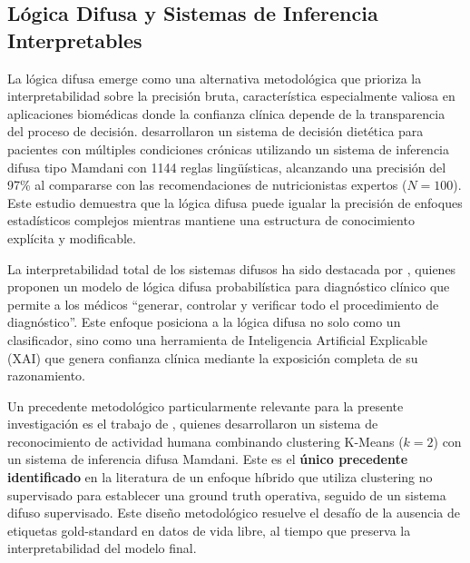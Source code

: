 
\subsection{Lógica Difusa y Sistemas de Inferencia Interpretables}
\label{subsec:fuzzy_logic}

La lógica difusa emerge como una alternativa metodológica que prioriza la interpretabilidad sobre la precisión bruta, característica especialmente valiosa en aplicaciones biomédicas donde la confianza clínica depende de la transparencia del proceso de decisión. \cite{MarashiHosseini2023Dietary} desarrollaron un sistema de decisión dietética para pacientes con múltiples condiciones crónicas utilizando un sistema de inferencia difusa tipo Mamdani con 1144 reglas lingüísticas, alcanzando una precisión del 97\% al compararse con las recomendaciones de nutricionistas expertos ($N=100$). Este estudio demuestra que la lógica difusa puede igualar la precisión de enfoques estadísticos complejos mientras mantiene una estructura de conocimiento explícita y modificable.

La interpretabilidad total de los sistemas difusos ha sido destacada por \cite{Capitoli2025FuzzyXAI}, quienes proponen un modelo de lógica difusa probabilística para diagnóstico clínico que permite a los médicos ``generar, controlar y verificar todo el procedimiento de diagnóstico''. Este enfoque posiciona a la lógica difusa no solo como un clasificador, sino como una herramienta de Inteligencia Artificial Explicable (XAI) que genera confianza clínica mediante la exposición completa de su razonamiento.

Un precedente metodológico particularmente relevante para la presente investigación es el trabajo de \cite{Goncalves2021}, quienes desarrollaron un sistema de reconocimiento de actividad humana combinando clustering K-Means ($k=2$) con un sistema de inferencia difusa Mamdani. Este es el \textbf{único precedente identificado} en la literatura de un enfoque híbrido que utiliza clustering no supervisado para establecer una ground truth operativa, seguido de un sistema difuso supervisado. Este diseño metodológico resuelve el desafío de la ausencia de etiquetas gold-standard en datos de vida libre, al tiempo que preserva la interpretabilidad del modelo final.

